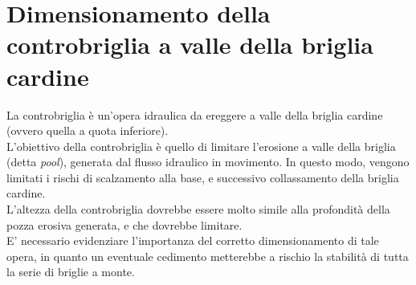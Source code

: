 \section{Dimensionamento della controbriglia a valle della briglia cardine}
La controbriglia è un'opera idraulica da ereggere a valle della briglia cardine (ovvero quella a quota inferiore).\\
L'obiettivo della controbriglia è quello di limitare l'erosione a valle della briglia (detta \textit{pool}), generata dal flusso idraulico in movimento. In questo modo, vengono limitati i rischi di scalzamento alla base, e successivo collassamento della briglia cardine.\\
L'altezza della controbriglia dovrebbe essere molto simile alla profondità della pozza erosiva generata, e che dovrebbe limitare.\\
E' necessario evidenziare l'importanza del corretto dimensionamento di tale opera, in quanto un eventuale cedimento metterebbe a rischio la stabilità di tutta la serie di briglie a monte.

